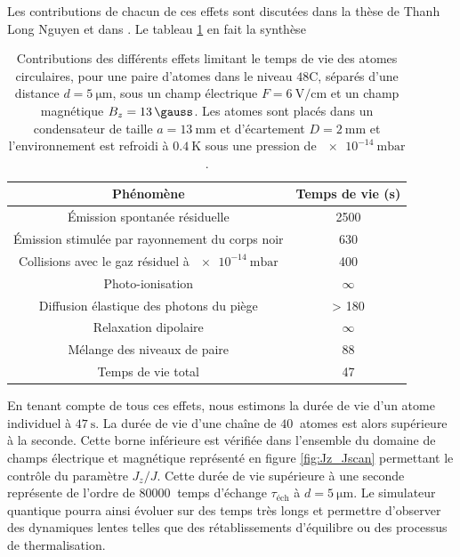 Les contributions de chacun de ces effets sont discutées dans la thèse de Thanh Long Nguyen \cite{PHD_NGUYEN} et dans \cite{ENS_PRE_CIRCSIM}.
Le tableau \ref{tab:lifetime_circsim} en fait la synthèse
%
\begin{table}[!h]
	\centering
	\caption[Contributions des différents effets limitant le temps de vie des atomes circulaires]{Contributions des différents effets limitant le temps de vie des atomes circulaires, pour une paire d'atomes dans le niveau $\mathrm{48C}$, séparés d'une distance $d=\SI{5}{\um}$, sous un champ électrique $F=\SI{6}{\V/\cm}$ et un champ magnétique $B_z=\SI{13}{\gauss}$.
	Les atomes sont placés dans un condensateur de taille $a=\SI{13}{\mm}$ et d'écartement $D=\SI{2}{\mm}$ et l'environnement est refroidi à $\SI{0.4}{\K}$ sous une pression de $\SI{e-14}{\milli\bar}$.
	}
	\label{tab:lifetime_circsim}
	\begin{tabular}{c c}
		\toprule\midrule
		Phénomène
		& Temps de vie (\si{\second})\\
		\midrule
		Émission spontanée résiduelle & \SI{2500}{} \\
		Émission stimulée par rayonnement du corps noir & \SI{630}{} \\
		Collisions avec le gaz résiduel à $\SI{e-14}{\milli\bar}$ & \SI{400}{} \\
		Photo-ionisation & $\infty$ \\
		Diffusion élastique des photons du piège & \SI{> 180}{} \\
		Relaxation dipolaire & $\infty$ \\
		Mélange des niveaux de paire & \SI{88}{} \\
		\midrule \midrule
		Temps de vie total & 47 \\
		\midrule \bottomrule
 	\end{tabular}
\end{table}
%
En tenant compte de tous ces effets, nous estimons la durée de vie d'un atome individuel à $\SI{47}{\second}$.
La durée de vie d'une chaîne de $\SI{40}{}$ atomes est alors supérieure à la seconde.
Cette borne inférieure est vérifiée dans l'ensemble du domaine de champs électrique et magnétique représenté en figure \ref{fig:Jz_Jscan} permettant le contrôle du paramètre $J_z/J$.
Cette durée de vie supérieure à une seconde représente de l'ordre de $\SI{80000}{}$ temps d'échange $\tau_{\text{éch}}$ à $d=\SI{5}{\um}$.
Le simulateur quantique pourra ainsi évoluer sur des temps très longs et permettre d'observer des dynamiques lentes telles que des rétablissements d'équilibre ou des processus de thermalisation.

